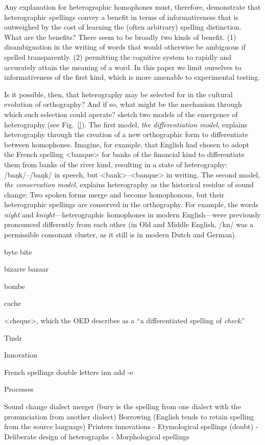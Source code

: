 \documentclass[doc,biblatex]{apa7}
\begin{document}
Any explanation for heterographic homophones must, therefore, demonstrate that heterographic spellings convey a benefit in terms of informativeness that is outweighed by the cost of learning the (often arbitrary) spelling distinction. What are the benefits? There seem to be broadly two kinds of benefit. (1) disambiguation in the writing of words that would otherwise be ambiguous if spelled transparently. (2) permitting the cognitive system to rapidly and accurately attain the meaning of a word. In this paper we limit ourselves to informativeness of the first kind, which is more amenable to experimental testing.

Is it possible, then, that heterography may be selected for in the cultural evolution of orthography? And if so, what might be the mechanism through which such selection could operate? \textcite[pp.~325--326]{Berg:2021} sketch two models of the emergence of heterography (see Fig.~\ref{}). The first model, \textit{the differentiation model}, explains heterography through the creation of a new orthographic form to differentiate between homophones. Imagine, for example, that English had chosen to adopt the French spelling <banque> for banks of the financial kind to differentiate them from banks of the river kind, resulting in a state of heterography: /baŋk/–/baŋk/ in speech, but <bank>–<banque> in writing. The second model, \textit{the conservation model}, explains heterography as the historical residue of sound change: Two spoken forms merge and become homophonous, but their heterographic spellings are conserved in the orthography. For example, the words \textit{night} and \textit{knight}---heterographic homophones in modern English---were previously pronounced differently from each other (in Old and Middle English, /kn/ was a permissible consonant cluster, as it still is in modern Dutch and German).

byte bite

bizarre bazaar

bombe

cache

<cheque>, which the OED describes as a ``a differentiated spelling of \textit{check}.''

Tindr


Innovation

French spellings
double letters inn
add -e


Processes

Sound change
dialect merger (bury is the spelling from one dialect with the pronunciation from another dialect)
Borrowing (English tends to retain spelling from the source language)
Printers innovations
- Etymological spellings (doubt)
- Deliberate design of heterographs
- Morphological spellings
\end{document}
